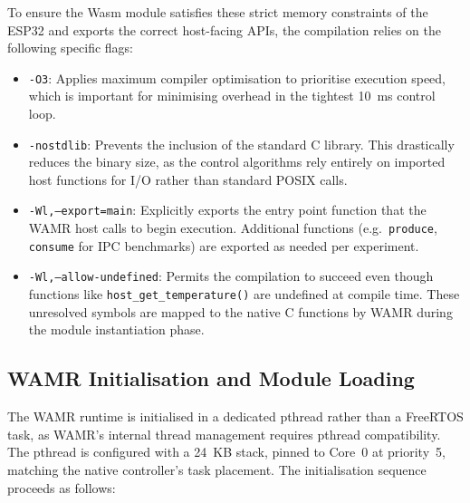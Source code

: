 \documentclass[12pt, a4paper]{report}
\begin{document}
To ensure the Wasm module satisfies these strict memory constraints of the ESP32 and exports the correct host-facing APIs, the compilation relies on the following specific flags:

\begin{itemize}
    \item \texttt{-O3}: Applies maximum compiler optimisation to prioritise execution speed, which is important for minimising overhead in the tightest 10~ms control loop.
    \item \texttt{-nostdlib}: Prevents the inclusion of the standard C library. This drastically reduces the binary size, as the control algorithms rely entirely on imported host functions for I/O rather than standard POSIX calls.
    \item \texttt{-Wl,--export=main}: Explicitly exports the entry point function that the WAMR host calls to begin execution. Additional functions (e.g.\ \texttt{produce}, \texttt{consume} for IPC benchmarks) are exported as needed per experiment.
    \item \texttt{-Wl,--allow-undefined}: Permits the compilation to succeed even though functions like \texttt{host\_get\_temperature()} are undefined at compile time. These unresolved symbols are mapped to the native C functions by WAMR during the module instantiation phase.
\end{itemize}

\subsection{WAMR Initialisation and Module Loading}
\label{subsec:wamr-init}

The WAMR runtime is initialised in a dedicated pthread rather than a FreeRTOS task, as WAMR's internal thread management requires pthread compatibility. The pthread is configured with a 24~KB stack, pinned to Core~0 at priority~5, matching the native controller's task placement. The initialisation sequence proceeds as follows:
\end{document}
